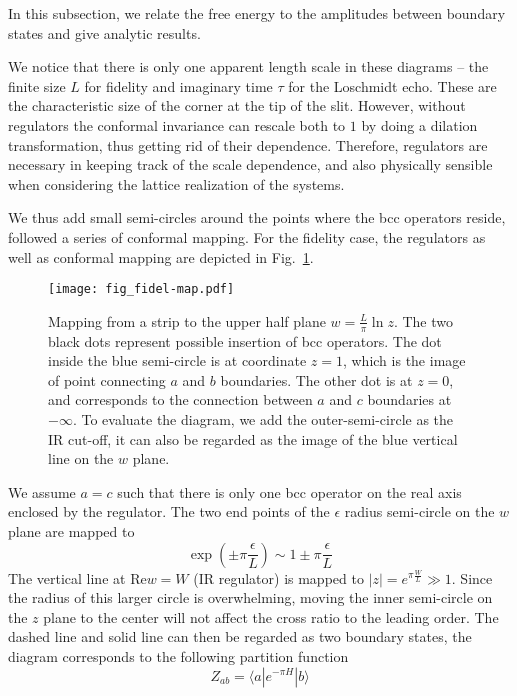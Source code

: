 
In this subsection, we relate the free energy to the amplitudes between boundary states and give analytic results. 

We notice that there is only one apparent length scale in these diagrams -- the finite size $L$ for fidelity and imaginary time $\tau$ for the Loschmidt echo. These are the characteristic size of the corner at the tip of the slit. However, without regulators the conformal invariance can rescale both to $1$ by doing a dilation transformation, thus getting rid of their dependence. Therefore, regulators are necessary in keeping track of the scale dependence, and also physically sensible when considering the lattice realization of the systems. 

We thus add small semi-circles around the points where the bcc operators reside, followed a series of conformal mapping. For the fidelity case, the regulators as well as conformal mapping are depicted in Fig.~\ref{fig:fidel-map}. 
\begin{figure}[h]
\centering
\texttt{[image: fig\_fidel-map.pdf]}
\caption{Mapping from a strip to the upper half plane $w = \frac{L}{\pi} \ln z $. The two black dots represent possible insertion of bcc operators. The dot inside the blue semi-circle is at coordinate $z = 1$, which is the image of point connecting $a$ and $b$ boundaries. The other dot is at $z = 0$, and corresponds to the connection between $a$ and $c$ boundaries at $- \infty$. To evaluate the diagram, we add the outer-semi-circle as the IR cut-off, it can also be regarded as the image of the blue vertical line on the $w$ plane.}
\label{fig:fidel-map}
\end{figure}
We assume $a = c$ such that there is only one bcc operator on the real axis enclosed by the regulator. The two end points of the $\epsilon$ radius semi-circle on the $w$ plane are mapped to
\begin{equation}
\exp( \pm \pi \frac{\epsilon}{ L}  ) \sim 1 \pm \pi \frac{\epsilon}{L} 
\end{equation}
The vertical line at $\text{Re} w = W$ (IR regulator) is mapped to $|z| = e^{\pi \frac{W}{L} } \gg 1 $. Since the radius of this larger circle is overwhelming, moving the inner semi-circle on the $z$ plane to the center will not affect the cross ratio to the leading order. The dashed line and solid line can then be regarded as two boundary states, the diagram corresponds to the following partition function
\begin{equation}
  Z_{ab} = \langle a | e^{-\pi H } |b \rangle 
\end{equation}



